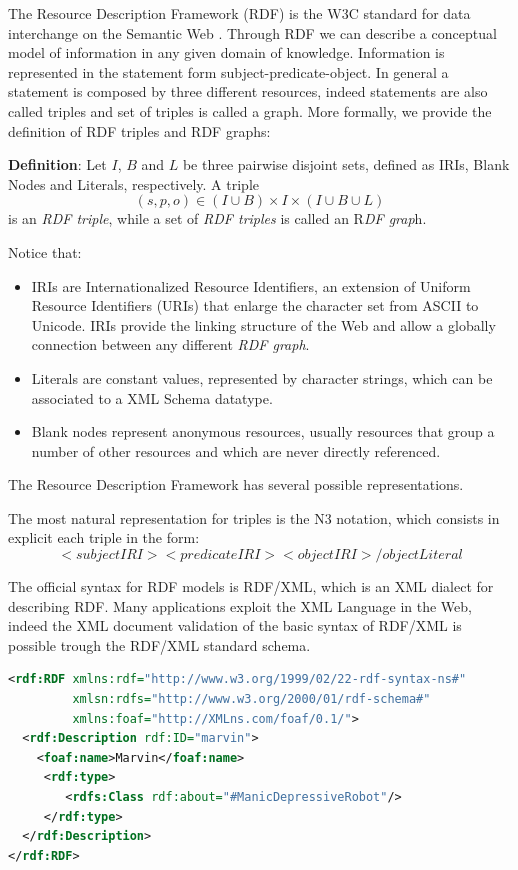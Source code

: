 The Resource Description Framework (RDF) is the W3C standard for data interchange on the Semantic Web \cite{rdfconcepts}. Through RDF we can describe a conceptual model of information in any given domain of knowledge. Information is represented in the statement form subject-predicate-object. In general a statement is composed by three different resources, indeed statements are also called triples and set of triples is called a graph. More formally, we provide the definition of RDF triples and RDF graphs:

\textbf{Definition}: Let $I$, $B$ and $L$ be three pairwise disjoint sets, defined as IRIs, Blank Nodes and Literals, respectively. A triple \[ (s, p, o) \in (I \cup B) × I × (I \cup B \cup L) \] is  an \textit{RDF triple}, while a set of \textit{RDF triples} is called an R\textit{DF grap}h.

Notice that:
\begin{itemize}
\item IRIs are Internationalized Resource Identifiers, an extension of Uniform Resource Identifiers (URIs) that enlarge the character set from ASCII to Unicode.  IRIs provide the linking structure of the Web and allow a globally connection between any different \textit{RDF graph}.
\item Literals are constant values, represented by character strings, which can be associated to a XML Schema datatype. 
\item Blank nodes represent anonymous resources, usually resources that group a number of other resources and which are never directly referenced.
\end{itemize}

The Resource Description Framework has several possible representations.

The most natural representation for triples is the N3 notation, which consists in explicit each triple in the form:
 \[<subjectIRI> <predicateIRI> <objectIRI>/objectLiteral\]
 
The official syntax for RDF models is RDF/XML, which is an XML dialect for describing RDF. Many applications exploit the XML Language in the Web, indeed the XML document validation of the basic syntax of RDF/XML is possible trough the RDF/XML standard schema. 

\begin{lstlisting}[language=XML, caption=An example of a simple RDF/XML document:, label=code:rdf]
<rdf:RDF xmlns:rdf="http://www.w3.org/1999/02/22-rdf-syntax-ns#"
 		 xmlsn:rdfs="http://www.w3.org/2000/01/rdf-schema#"
 		 xmlns:foaf="http://XMLns.com/foaf/0.1/">
  <rdf:Description rdf:ID="marvin">
    <foaf:name>Marvin</foaf:name>
     <rdf:type>
        <rdfs:Class rdf:about="#ManicDepressiveRobot"/>
     </rdf:type>
  </rdf:Description>
</rdf:RDF>
\end{lstlisting}

